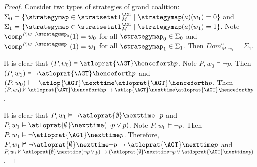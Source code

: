 \begin{proof}
  Consider two types of strategies of grand coalition: $\Sigma_0=\{\strategymap\in \stratsetatl_{M}^{\AGT}\mid \strategymap(a)(w_1)=0\}$ and $\Sigma_1=\{\strategymap\in \stratsetatl_{M}^{\AGT}\mid \strategymap(a)(w_1)=1\}$. Note $\comp^{P,w_1,\strategymap_0}(1)=w_0$ for all $\strategymap_0\in \Sigma_0$ and $\comp^{P,w_1,\strategymap_1}(1)=w_1$ for all $\strategymap_1\in \Sigma_1$. Then $\mathit{Dom}_{M,w_1}^a=\Sigma_1$.
  
  It is clear that $(P,w_0)\vDash \atloprat{\AGT }\henceforth p$. Note $P,w_0\vDash \neg p$. Then $(P,w_1)\vDash \neg \atloprat{\AGT }\henceforth p$ and $(P,w_0)\vDash \neg \atlop{\AGT }\nexttime\atloprat{\AGT }\henceforth p$. Then $(P,w_0)\nvDash \atloprat{\AGT }\henceforth p\to \atlop{\AGT }\nexttime\atloprat{\AGT }\henceforth p$.

It is clear that $P,w_1\vDash \neg \atloprat{\emptyset }\nexttime \neg p$ and $P,w_1\vDash \atloprat{\emptyset }\nexttime (\neg p\vee p)$. 
Note $P,w_0\vDash \neg p$. Then $P,w_1\vDash \neg \atloprat{\AGT }\nexttime p$. Therefore, $P,w_1\nvDash \neg \atloprat{\emptyset }\nexttime \neg p \to \atloprat{\AGT}\nexttime p $ and $P,w_1\nvDash \atloprat{\emptyset } \nexttime (\neg p \lor p) \rightarrow (\atloprat{\emptyset } \nexttime \neg p \lor \atloprat{\AGT} \nexttime p) $.
\end{proof}

